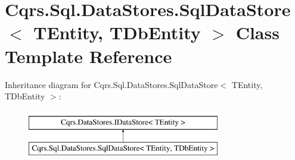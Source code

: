\hypertarget{classCqrs_1_1Sql_1_1DataStores_1_1SqlDataStore}{}\section{Cqrs.\+Sql.\+Data\+Stores.\+Sql\+Data\+Store$<$ T\+Entity, T\+Db\+Entity $>$ Class Template Reference}
\label{classCqrs_1_1Sql_1_1DataStores_1_1SqlDataStore}
Inheritance diagram for Cqrs.\+Sql.\+Data\+Stores.\+Sql\+Data\+Store$<$ T\+Entity, T\+Db\+Entity $>$\+:\begin{figure}[H]
\begin{center}
\leavevmode
\includegraphics[height=2.000000cm]{classCqrs_1_1Sql_1_1DataStores_1_1SqlDataStore}
\end{center}
\end{figure}
